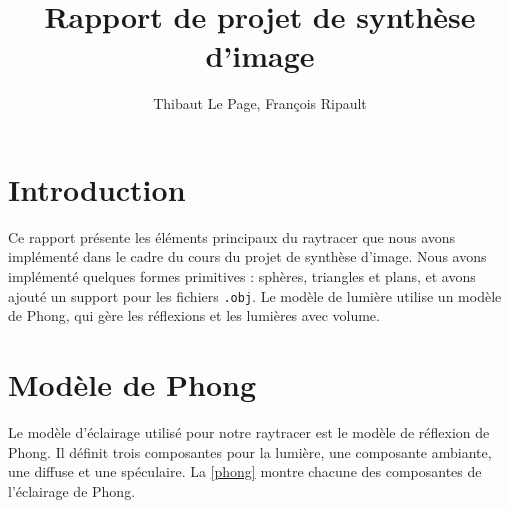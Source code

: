 \documentclass{article}
\title{Rapport de projet de synthèse d'image}
\author{Thibaut Le Page, François Ripault}
\begin{document}
\maketitle

\section*{Introduction}

Ce rapport présente les éléments principaux du raytracer que nous avons
implémenté dans le cadre du cours du projet de synthèse d'image. Nous avons
implémenté quelques formes primitives : sphères, triangles et plans, et avons
ajouté un support pour les fichiers \texttt{.obj}. Le modèle de lumière utilise un
modèle de Phong, qui gère les réflexions et les lumières avec volume.

\section{Modèle de Phong}

Le modèle d'éclairage utilisé pour notre raytracer est le modèle de réflexion
de Phong. Il définit trois composantes pour la lumière, une composante
ambiante, une diffuse et une spéculaire.
La \cref{phong} montre chacune des composantes de l'éclairage de Phong.
\end{document}
